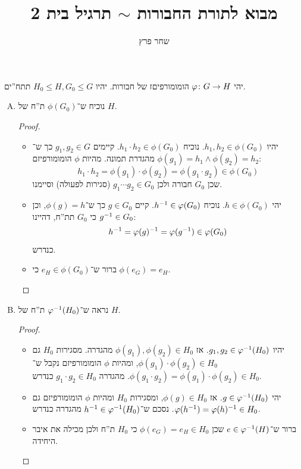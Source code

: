 \documentclass[]{../../../../../tex/classes/homework}
\author{שחר פרץ}
\title{מבוא לתורת החבורות $\sim$ תרגיל בית 2}
\begin{document}
	\maketitle
	
	\section{}
	יהי $\varphi \colon G \to H$ הומומורפיםז של חבורות. יהיו $H_0 \le H, G_0 \le G$ תתח''ים. 
	\begin{enumerate}[(A)]
		\item נוכיח ש־$\phi(G_0)$ ת''ח של $H$. \begin{proof}
			\begin{itemize}
				\item  יהיו $h_1, h_2 \in \phi(G_0)$. נוכיח $h_1\cdot h_2 \in \phi(G_0)$. קיימים $g_1, g_2 \in G$ כך ש־$\phi(g_1) = h_1 \land \phi(g_2) =h_2$ מהגדרת תמונה. מהיות $\phi$ הומומורפיזם:
				\[ h_1 \cdot h_2 = \phi(g_1) \cdot \phi(g_2) = \phi(g_1 \cdot g_2) \in \phi(G_0) \]
				שכן $G_0$ חבורה ולכן $g_1 \cdots g_2 \in G_0$ (סגירות לפעולה) וסיימנו. 
				
				\item יהי $h \in \phi(G_0)$. נוכיח $h^{-1} \in \varphi(G_0)$. קיים $g \in G_0$ כך ש־$\phi(g) =h$, וכן $g^{-1} \in G_0$ כי $G_0$ תת''ח, דהיינו: 
				\[ h^{-1} = \varphi(g)^{-1} = \varphi(g^{-1}) \in \varphi(G_0) \]
				כנדרש. 
				\item ברור ש־$e_H \in \phi(G_0)$ כי $\phi(e_G) = e_H$. 
			\end{itemize}
		\end{proof}
		\item נראה ש־$\varphi^{-1}(H_0)$ ת''ח של $H$. \begin{proof}
			\begin{itemize}
				\item יהיו $g_1, g_2 \in \varphi^{-1}(H_0)$. אז $\phi(g_1), \phi(g_2) \in H_0$ מהגדרה. מסגירות $H_0$ גם $\phi(g_1) \cdot \phi(g_2) \in H_0$, ומהיות $\phi$ הומומורפיזם נקבל ש־$\phi(g_1 \cdot g_2) = \phi(g_1) \cdot \phi(g_2) \in H_0$. מהגדרה $g_1 \cdot g_2 \in H_0$ כנדרש. 
				\item יהי $g \in \varphi^{-1}(H_0)$. אז $\phi(g) \in H_0$, ומסגירות $H_0$ ומהיות $\phi$ הומומורפיזם גם $\varphi(h^{-1}) = \varphi(h)^{-1} \in H_0$. נסכם ש־$h^{-1} \in \varphi^{-1}(H_0)$ מהגדרה כנדרש. 
				\item ברור ש־$e \in \varphi^{-1}(H)$ שכן $\phi(e_G) = e_H \in H_0$ כי $H_0$ ת''ח ולכן מכילה את איבר היחידה. 
			\end{itemize}
		\end{proof}
	\end{enumerate}
	
\end{document}
